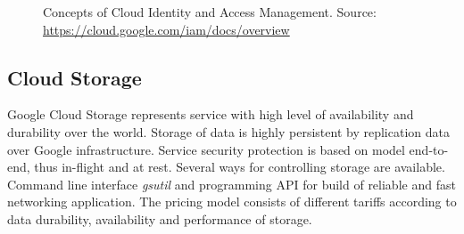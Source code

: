 \documentclass[a4paper,12pt,oneside]{report}
\begin{document}
	\begin{figure}[!htbp]
		\centering
		
		
		\caption[access]{Concepts of Cloud Identity and Access Management. Source: \url{https://cloud.google.com/iam/docs/overview} 
			\centering }
		\label{fig:iam}
	\end{figure}
	
	
	\subsection{Cloud Storage}
	\label{subsub:datastore}
	Google Cloud Storage represents service  with high level of availability and durability 
	over the world. Storage of data is highly persistent by replication data over
	Google 
	infrastructure. Service security protection is based 
	on model end-to-end, thus in-flight and at rest.  Several ways for controlling
	storage are available. Command 
	line interface \textit{gsutil} and programming API for build of 
	reliable and fast networking application. The pricing model consists of different
	tariffs 
	according to data durability, availability and performance of storage.
	
\end{document}
